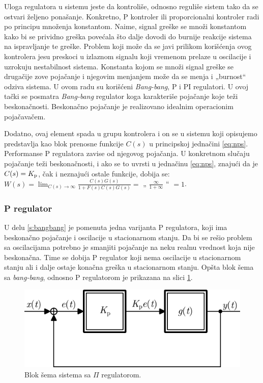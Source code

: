 \documentclass[a4paper, 12pt, diplomski]{etf}
\newcommand{\navod}[1]{„#1“}
\begin{document}
Uloga regulatora u sistemu jeste da kontroliše, odnosno reguliše sistem tako da se ostvari željeno ponašanje. Konkretno, P kontroler ili proporcionalni kontroler radi po principu množenja konstantom. Naime, signal greške se množi konstantom kako bi se prividno greška povećala što dalje dovodi do burnije reakcije sistema na ispravljanje te greške. Problem koji može da se javi prilikom korišćenja ovog kontrolera jesu preskoci u izlaznom signalu koji vremenom prelaze u oscilacije i uzrokuju nestabilnost sistema. Konstanta kojom se množi signal greške se drugačije zove pojačanje i njegovim menjanjem može da se menja i \navod{burnost} odziva sistema.
U ovom radu su korišćeni \textit{Bang-bang}, P i PI regulatori. U ovoj tački se posmatra \textit{Bang-bang} regulator koga karakteriše pojačanje koje teži beskonačnosti. Beskonačno pojačanje je realizovano idealnim operacionim pojačavačem. 


Dodatno, ovaj element spada u grupu kontrolera i on se u sistemu koji opisujemo predstavlja kao blok prenosne funkcije $C(s)$ u principskoj jednačini \eqref{eq:nps}.
Performanse P regulatora zavise od njegovog pojačanja. U konkretnom slučaju pojačanje teži beskonačnosti, i ako se to uvrsti u jednačinu \eqref{eq:nps}, znajući da je $C(s) = K_{\rm p}$, čak i neznajući ostale funkcije, dobija se: $W(s) = \lim_{C(s) \to \infty} \frac{C(s)G(s)}{1 + F(s)C(s)G(s)} =$ \navod{ $\frac{\infty}{1 + \infty}$ } $ = 1$.


\subsubsection{P regulator}

U delu \ref{s:bangbang} je pomenuta jedna varijanta P regulatora, koji ima beskonačno pojačanje i oscilacije u stacionarnom stanju. Da bi se rešio problem sa oscilacijama potrebno je smanjiti pojačanje na neku realnu vrednost koja nije beskonačna. Time se dobija P regulator koji nema oscilacije u stacionarnom stanju ali i dalje ostaje konačna greška u stacionarnom stanju. Opšta blok šema sa \textit{bang-bang}, odnosno P regulatorom je prikazana na slici \ref{Preg}.


\begin{figure}[h!]
    \centering
    \includegraphics[scale=1]{fig/Preg.pdf}
    \caption{Blok šema sistema sa $\Pi$ regulatorom.}
    \label{Preg}
\end{figure}
\end{document}
